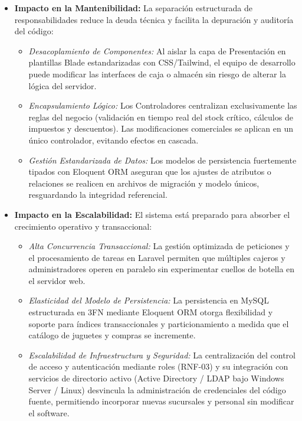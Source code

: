 \documentclass[12pt,a4paper]{article}
\begin{document}
\begin{itemize}
    \item \textbf{Impacto en la Mantenibilidad:} La separación estructurada de responsabilidades reduce la deuda técnica y facilita la depuración y auditoría del código:
    \begin{itemize}
        \item \emph{Desacoplamiento de Componentes:} Al aislar la capa de Presentación en plantillas Blade estandarizadas con CSS/Tailwind, el equipo de desarrollo puede modificar las interfaces de caja o almacén sin riesgo de alterar la lógica del servidor.
        \item \emph{Encapsulamiento Lógico:} Los Controladores centralizan exclusivamente las reglas del negocio (validación en tiempo real del stock crítico, cálculos de impuestos y descuentos). Las modificaciones comerciales se aplican en un único controlador, evitando efectos en cascada.
        \item \emph{Gestión Estandarizada de Datos:} Los modelos de persistencia fuertemente tipados con Eloquent ORM aseguran que los ajustes de atributos o relaciones se realicen en archivos de migración y modelo únicos, resguardando la integridad referencial.
    \end{itemize}
    \item \textbf{Impacto en la Escalabilidad:} El sistema está preparado para absorber el crecimiento operativo y transaccional:
    \begin{itemize}
        \item \emph{Alta Concurrencia Transaccional:} La gestión optimizada de peticiones y el procesamiento de tareas en Laravel permiten que múltiples cajeros y administradores operen en paralelo sin experimentar cuellos de botella en el servidor web.
        \item \emph{Elasticidad del Modelo de Persistencia:} La persistencia en MySQL estructurada en 3FN mediante Eloquent ORM otorga flexibilidad y soporte para índices transaccionales y particionamiento a medida que el catálogo de juguetes y compras se incremente.
        \item \emph{Escalabilidad de Infraestructura y Seguridad:} La centralización del control de acceso y autenticación mediante roles (RNF-03) y su integración con servicios de directorio activo (Active Directory / LDAP bajo Windows Server / Linux) desvincula la administración de credenciales del código fuente, permitiendo incorporar nuevas sucursales y personal sin modificar el software.
    \end{itemize}
\end{itemize}
\end{document}
